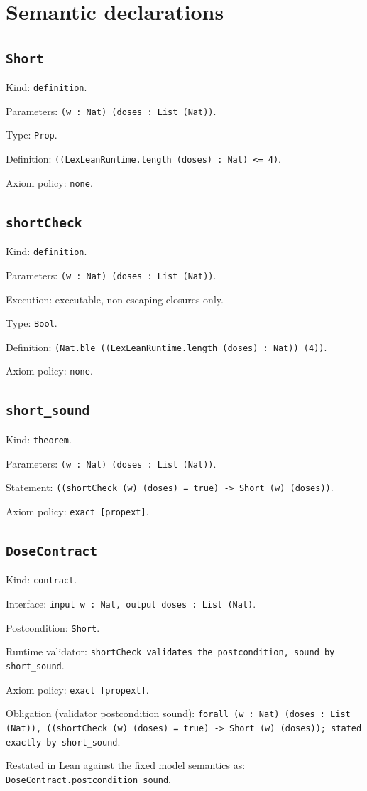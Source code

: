 \documentclass[11pt]{article}
\begin{document}
\section*{Semantic declarations}
\subsection*{\texttt{Short}}
\noindent Kind: \texttt{definition}.\par
\noindent Parameters: \texttt{(w : Nat) (doses : List (Nat))}.\par
\noindent Type: \texttt{Prop}.\par
\noindent Definition: \texttt{((LexLeanRuntime.length (doses) : Nat) <= 4)}.\par
\noindent Axiom policy: \texttt{none}.\par
\subsection*{\texttt{shortCheck}}
\noindent Kind: \texttt{definition}.\par
\noindent Parameters: \texttt{(w : Nat) (doses : List (Nat))}.\par
\noindent Execution: executable, non-escaping closures only.\par
\noindent Type: \texttt{Bool}.\par
\noindent Definition: \texttt{(Nat.ble ((LexLeanRuntime.length (doses) : Nat)) (4))}.\par
\noindent Axiom policy: \texttt{none}.\par
\subsection*{\texttt{short\_sound}}
\noindent Kind: \texttt{theorem}.\par
\noindent Parameters: \texttt{(w : Nat) (doses : List (Nat))}.\par
\noindent Statement: \texttt{((shortCheck (w) (doses) = true) -> Short (w) (doses))}.\par
\noindent Axiom policy: \texttt{exact [propext]}.\par
\subsection*{\texttt{DoseContract}}
\noindent Kind: \texttt{contract}.\par
\noindent Interface: \texttt{input w : Nat, output doses : List (Nat)}.\par
\noindent Postcondition: \texttt{Short}.\par
\noindent Runtime validator: \texttt{shortCheck validates the postcondition, sound by short\_sound}.\par
\noindent Axiom policy: \texttt{exact [propext]}.\par
\noindent Obligation (validator postcondition sound): \texttt{forall (w : Nat) (doses : List (Nat)), ((shortCheck (w) (doses) = true) -> Short (w) (doses)); stated exactly by short\_sound}.\par
\noindent Restated in Lean against the fixed model semantics as: \texttt{DoseContract.postcondition\_sound}.\par
\end{document}
